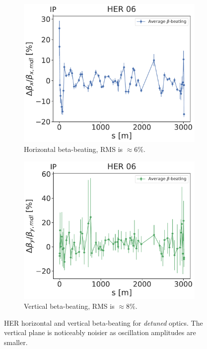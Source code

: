 \begin{figure}[!htb]
    \centering
    \begin{subfigure}[b]{0.48\textwidth}
        \includegraphics[width=\linewidth]{images/kek/her_06_bet_x.pdf}
        \caption{Horizontal beta-beating, RMS is $\approx 6\%$.}
    \end{subfigure}
    \hfill
    \begin{subfigure}[b]{0.48\textwidth}
        \includegraphics[width=\linewidth]{images/kek/her_06_bet_y.pdf}
        \caption{Vertical beta-beating, RMS is $\approx 8\%$.}
    \end{subfigure}
    \caption{HER horizontal and vertical beta-beating for \textit{detuned} optics. The vertical
    plane is noticeably noisier as oscillation amplitudes are smaller.}
    \label{fig:kek:beating_her_detuned}
\end{figure}

